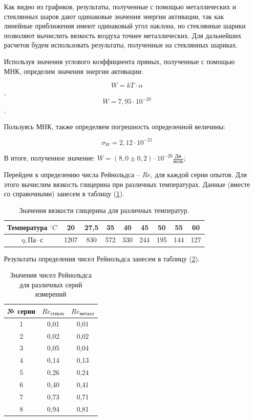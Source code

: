 \documentclass[a4paper, 12pt]{article}%
\begin{document}
Как видно из графиков, результаты, полученные с помощью металлических и стеклянных шаров дают одинаковые значения энергии активации, так как линейные приближения имеют одинаковый угол наклона, но стеклянные шарики позволяют вычислить вязкость воздуха точнее металлических. Для дальнейших расчетов будем использовать результаты, полученные на стеклянных шариках.

Используя значения углового коэффициента прямых, полученные с помощью МНК, определим значения энергии активации:

$$W = kT \cdot \alpha $$, $$W = 7,95\cdot 10^{-20}$$. 

Пользуясь МНК, также определяем погрешность определенной величины:

$$\sigma_{W} = 2,12 \cdot 10^{-21}$$

В итоге, полученное значение: $W = \left(8,0 \pm 0,2\right)\cdot 10^{-20} \frac{\text{Дж}}{\text{моль}}$;

Перейдем к определению числа Рейнольдса -- $Re$, для каждой серии опытов. Для этого вычислим вязкость глицерина при различных температурах. Данные (вместе со справочными) занесем в таблицу (\ref{tab:results}).

\begin{table}[h]
\centering
\begin{tabular}{|c|c|c|c|c|c|c|c|c|}
\hline
Температура  $^\circ C$     & 20   & 27,5 & 35  & 40  & 45  & 50  & 55  & 60  \\ \hline
$\eta, \text{Па} \cdot \text{с}$ & 1207 & 830  & 572 & 330 & 244 & 195 & 144 & 127 \\ \hline
\end{tabular}
\caption{Значения вязкости глицерина для различных температур.}
\label{tab:results}
\end{table}  

Результаты определения чисел Рейнольдса занесем в таблицу (\ref{tab:reynolds_number}).

\begin{table}[h!]
\centering
\begin{tabular}{|c|c|c|}
\hline
№ серии & $Re_{\text{стекло}}$ & $Re_{\text{металл}}$ \\ \hline
1       & 0,01                 & 0,01                 \\ \hline
2       & 0,02                 & 0,02                 \\ \hline
3       & 0,05                 & 0,04                 \\ \hline
4       & 0,14                 & 0,13                 \\ \hline
5       & 0,26                 & 0,24                 \\ \hline
6       & 0,40                 & 0,41                 \\ \hline
7       & 0,73                 & 0,71                 \\ \hline
8       & 0,94                 & 0,81                 \\ \hline
\end{tabular}
\caption{Значения чисел Рейнольдса для различных серий измерений}
\label{tab:reynolds_number}
\end{table}
\end{document}
